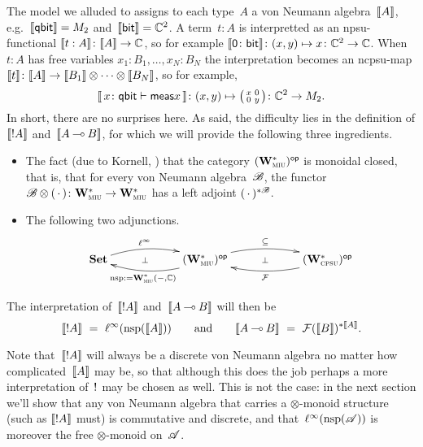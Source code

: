 \documentclass[a]{subfiles}
\begin{document}
\begin{parsec}
\begin{point}
The model
we alluded to
assigns to each type~$A$ a von Neumann algebra~$\llbracket A\rrbracket$,
e.g.~$\llbracket\mathsf{qbit}\rrbracket=M_2$
and~$\llbracket\mathsf{bit}\rrbracket=\mathbb{C}^2$.
A term~$t:A$
is interpretted as an npsu-functional $\llbracket t:A\rrbracket\colon \llbracket A\rrbracket\to\mathbb{C}$,
so for example $\llbracket\mathsf{0}\colon \mathsf{bit}\rrbracket\colon
(x,y)\mapsto x\colon \mathbb{C}^2\to\mathbb{C}$.
When~$t:A$ has free variables $x_1:B_1,\dotsc,x_N:B_N$
the interpretation 
becomes an ncpsu-map $\llbracket t\rrbracket\colon \llbracket A\rrbracket\to\llbracket B_1\rrbracket\otimes 
\dotsb \otimes \llbracket B_N\rrbracket$,
so for example,
\begin{equation*}
	\llbracket\, x\colon \mathsf{qbit} \vdash \mathsf{meas} x\,\rrbracket
\colon (x,y)\mapsto
\smash{\bigl(
	\begin{smallmatrix}x& 0 \\ 0 & y
	\end{smallmatrix}\bigr)}
\colon \mathbb{C}^2\to M_2.
\end{equation*}
In short, there are no surprises here.
As said, the difficulty lies
in the definition
of $\llbracket!A\rrbracket$ and~$\llbracket A\mathbin{\multimap} B\rrbracket$,
for which we will provide the following
three ingredients.
\begin{itemize}
\item
The fact (due to Kornell, \cite{kornell2012})
that
the category 
${(\mathbf{W}^*_{\text{\textsc{miu}}})}{^{\mathsf{op}}}$
is monoidal closed,
that is,
that
for every von Neumann algebra~$\mathscr{B}$,
the functor
$\mathscr{B}\otimes (\,\cdot\,)\colon 
\mathbf{W}^*_{\text{\textsc{miu}}}\to \mathbf{W}^*_{\text{\textsc{miu}}}$
has a left adjoint
$(\,\cdot\,)^{*\mathscr{B}}$.

\item
The following two adjunctions.
\begin{equation*}
\xymatrix@C=6em{
	\Cat{Set}
	\ar@/^1.0em/[r]^-{\ell^\infty}
	\ar@{}[r]|-{\perp}
	&
	\op{(\W{miu})}
	\ar@/^1.0em/[r]^-{\subseteq}
	\ar@/^1.0em/[l]^-{\nsp:=\W{miu}(-,\C)}
	\ar@{}[r]|-{\perp}
	&
	\op{(\W{cpsu})}
	\ar@/^1.0em/[l]^-{\mathcal{F}}
}
\end{equation*}
\end{itemize}
\end{point}
The interpretation of~$\llbracket!A\rrbracket$
and~$\llbracket A\mathbin{\multimap} B\rrbracket$ will then be
\begin{equation*}
\sem{!A}\ =\ 
\linf(\nsp(\sem{A}))
\qquad\text{and}\qquad
\sem{A\limp B}
\ = \ 
\mathcal{F}(\sem{B})^{*\sem{A}}.
\end{equation*}



Note that~$\llbracket!A\rrbracket$
will always be a discrete von Neumann algebra
no matter how complicated~$\llbracket A\rrbracket$ may be,
so that although this does the job
perhaps a more interpretation of~$\mathord{!}$
may be chosen as well.
This is not the case:
in the next
section we'll show that
any von Neumann algebra
that carries 
a $\otimes$-monoid structure
(such as $\llbracket!A\rrbracket$ must)
is commutative and discrete,
and that~$\ell^\infty(\mathrm{nsp}(\mathscr{A}))$
is moreover the free $\otimes$-monoid
on~$\mathscr{A}$.
\end{parsec}
\end{document}
